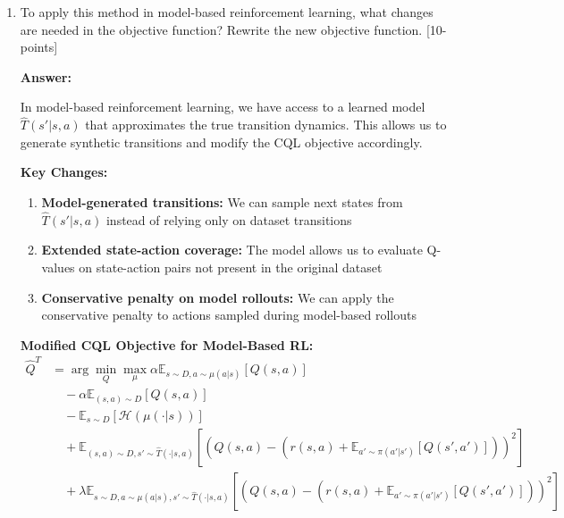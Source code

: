 \documentclass[12pt]{article}
\begin{document}
{{\begin{enumerate}
    \textbf{Step 6:} Substitute $\mu^*$ back into the original objective to get the minimization-only form:
    \begin{align}
    \hat{Q}^T &= \arg \min_{Q} \alpha \mathbb{E}_{s \sim D} \left[ \log \sum_a \exp(Q(s,a)) - \mathbb{E}_{a \sim \hat{\pi}_{\beta}(a|s)} [Q(s,a)] \right] \\
    &\quad + \mathbb{E}_{(s,a,s') \sim D} \left[ (Q(s,a) - (r(s,a) + \mathbb{E}[Q(s',a')]))^2 \right]
    \end{align}
    
    This is the \textbf{CQL($\mathcal{H}$)} objective, which is a pure minimization problem that learns conservative Q-values by penalizing the log-sum-exp of Q-values while rewarding Q-values for dataset actions.

    \item To apply this method in model-based reinforcement learning, what changes are needed in the objective function? Rewrite the new objective function. [10-points]
    
    \textbf{Answer:}
    
    In model-based reinforcement learning, we have access to a learned model $\hat{T}(s'|s,a)$ that approximates the true transition dynamics. This allows us to generate synthetic transitions and modify the CQL objective accordingly.
    
    \textbf{Key Changes:}
    \begin{enumerate}
        \item \textbf{Model-generated transitions:} We can sample next states from $\hat{T}(s'|s,a)$ instead of relying only on dataset transitions
        \item \textbf{Extended state-action coverage:} The model allows us to evaluate Q-values on state-action pairs not present in the original dataset
        \item \textbf{Conservative penalty on model rollouts:} We can apply the conservative penalty to actions sampled during model-based rollouts
    \end{enumerate}
    
    \textbf{Modified CQL Objective for Model-Based RL:}
    \begin{align}
    \hat{Q}^T &= \arg \min_{Q} \max_{\mu} \alpha \mathbb{E}_{s \sim D, a \sim \mu(a|s)} [Q(s,a)] \\
    &\quad - \alpha \mathbb{E}_{(s,a) \sim D} [Q(s,a)] \\
    &\quad - \mathbb{E}_{s \sim D} [\mathcal{H}(\mu(\cdot|s))] \\
    &\quad + \mathbb{E}_{(s,a) \sim D, s' \sim \hat{T}(\cdot|s,a)} \left[ (Q(s,a) - (r(s,a) + \mathbb{E}_{a' \sim \pi(a'|s')}[Q(s',a')]))^2 \right] \\
    &\quad + \lambda \mathbb{E}_{s \sim D, a \sim \mu(a|s), s' \sim \hat{T}(\cdot|s,a)} \left[ (Q(s,a) - (r(s,a) + \mathbb{E}_{a' \sim \pi(a'|s')}[Q(s',a')]))^2 \right]
    \end{align}
    

\end{enumerate}}}
\end{document}
